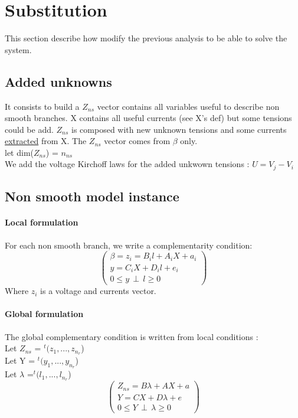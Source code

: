 \documentclass[10pt]{article}
\begin{document}
\section{Substitution}

This section describe how modify the previous analysis to be able to solve the system.\\

\subsection{Added unknowns}

It consists to build a $Z_{ns}$ vector contains all variables useful to describe non smooth
branches. X contains all useful currents (see X's def) but some tensions could be add. 
$Z_{ns}$ is composed with new unknown tensions and some currents \underline{extracted} from X. The $Z_{ns}$ vector comes from $\beta$ only.\\
  let dim($Z_{ns}$) = $n_{ns}$\\
 We add the voltage Kirchoff laws for the added unkwown tensions : $U=V_{j}-V_{i}$

\subsection{Non smooth model instance}

\paragraph{Local formulation}
For each non smooth branch, we write a complementarity condition:\\
\[\left(\begin{array}{c}
\beta = z_{i} = B_{i}l+A_{i}X + a_{i}\\
y=C_{i}X+D_{i}l+e_{i}\\
0 \leq y \, \perp \, l \geq 0
\end{array}\right)\]
Where $z_{i}$ is a voltage and currents vector.





\paragraph{Global formulation}
The global complementary condition is written from local conditions :\\
Let $Z_{ns}$ = $^{t}(z_{1},...,z_{n_{r}}$)\\
Let Y = $^{t}(y_{1},...,y_{n_{r}}$)\\
Let $\lambda$ =$^{t}(l_{1},...,l_{n_{r}}$)\\
\[\left(\begin{array}{c}
Z_{ns} = B\lambda +AX + a\\
Y=CX+D\lambda +e\\
0 \leq Y \, \perp \, \lambda \geq 0
\end{array}\right)\]
\end{document}
